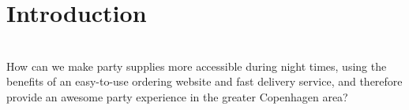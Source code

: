 \documentclass[12p]{article}
\begin{document}

\begin{abstract}
    \lipsum[1]
\end{abstract}

\newpage


\tableofcontents %

\newpage %


\section{Introduction}

\begin{center}
\vspace{1em}
\SlimHRule\\[0.1cm]
\Large{How can we make party supplies more accessible during night times, using the benefits of an easy-to-use ordering website and fast delivery service, and therefore provide an awesome party experience in the greater Copenhagen area?}
\SlimHRule\\[0.1cm]
\vspace{1em}
\end{center}
\end{document}
